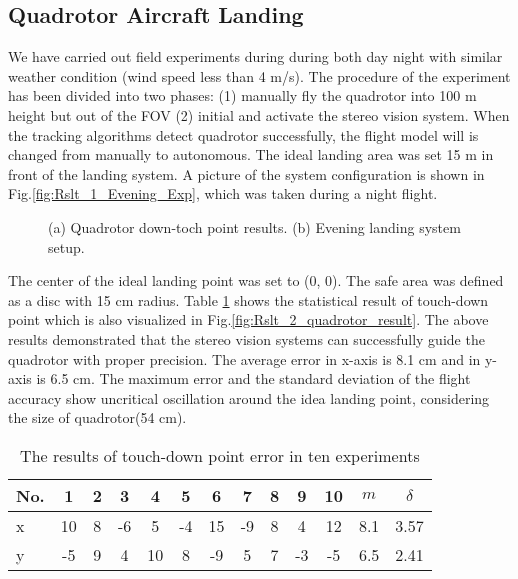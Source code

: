 \documentclass[letterpaper, 10 pt, conference]{ieeeconf}  %
\begin{document}
\subsection{Quadrotor Aircraft Landing}
We have carried out field experiments during during both day night with similar weather condition (wind speed less than 4 m/s). The procedure of the experiment has been divided into two phases: (1) manually fly the quadrotor into 100 m height but out of the FOV (2) initial and activate the stereo vision system. When the tracking algorithms detect quadrotor successfully, the flight model will is changed from manually to autonomous. The ideal landing area was set 15 m in front of the landing system. A picture of the system configuration is shown in Fig.\ref{fig:Rslt_1_Evening_Exp}, which was taken during a night flight.
    \begin{figure}[!tb]
      \centering
	\caption{(a) Quadrotor down-toch point results. (b) Evening landing system setup.}
   \end{figure}
The center of the ideal landing point was set to (0, 0). The safe area was defined as a disc with 15 cm radius. Table \ref{tab:Quadrotor_Landing_Error} shows the statistical result of  touch-down point which is also visualized in Fig.\ref{fig:Rslt_2_quadrotor_result}. The above results demonstrated that the stereo vision systems can successfully guide the quadrotor with proper precision. The average error in x-axis is 8.1 cm and in y-axis is 6.5 cm. The maximum error and the standard deviation of the flight accuracy show uncritical oscillation around the idea landing point, considering the size of quadrotor(54 cm).
  \begin{table}[!tb]
  \caption{The results of touch-down point error in ten experiments}
  \label{tab:Quadrotor_Landing_Error}
  \begin{center}
  \begin{scriptsize}
  \renewcommand{\arraystretch}{1.2}
    \begin{tabular}{|l|c|c|c|c|c|c|c|c|c|c|c|c|}
    \hline
    No.  & 1  & 2 &  3 & 4 & 5 & 6 & 7 & 8 & 9 & 10 & $m$ & $\delta$  \\ \hline
    x      & 10 & 8 & -6 & 5 &-4 & 15& -9& 8 & 4 & 12 & 8.1     &3.57    \\ \hline
    y      & -5 & 9 &  4 &10 & 8 & -9&  5& 7 & -3&-5  & 6.5     &2.41    \\ \hline
    \end{tabular}
  \end{scriptsize}
  \end{center}
  \end{table}
  
\end{document}
